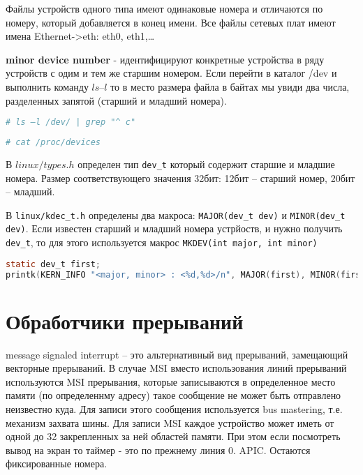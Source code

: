 Файлы устройств одного типа имеют одинаковые номера и отличаются по номеру, который добавляется в конец имени. Все файлы сетевых плат имеют имена Ethernet->eth: eth0, eth1,…

\textbf {minor device number} - идентифицируют конкретные устройства в ряду устройств с одим и тем же старшим номером. Если перейти в каталог /dev и выполнить команду $ls –l$ то в место размера файла в байтах мы увиди два числа, разделенных запятой (старший и младший номера).

\begin{lstlisting}[language=bash, caption = {выведет файлы символьных устрйоств}, label=code_file_sim_dev]
# ls –l /dev/ | grep "^ c" 
\end{lstlisting}

\begin{lstlisting}[language=bash, caption = {выведется информация о старших номерах устройств, известных ядру}, label=code_maj_num]
# cat /proc/devices 
\end{lstlisting}

В $linux/types.h$ определен тип \verb|dev_t| который содержит старшие и младшие номера. Размер соответствующего значения 32бит: 12бит – старший номер, 20бит – младший.

В \verb|linux/kdec_t.h| определены два макроса: \verb|MAJOR(dev_t dev)| и \verb|MINOR(dev_t dev)|.
Если известен старший и младший номера устрйоств, и нужно получить \verb|dev_t|, то для этого используется макрос
\verb|MKDEV(int major, int minor)|

\begin{lstlisting}[language=c, caption=Печать старшего и младшего номера устройства]
static dev_t first;
printk(KERN_INFO "<major, minor> : <%d,%d>/n", MAJOR(first), MINOR(first));
\end{lstlisting}

\section{Обработчики прерываний}
message signaled interrupt – это альтернативный вид прерываний, замещающий векторные прерываний.
В случае MSI вместо использования линий прерываний используются MSI прерывания, которые записываются в определенное место памяти (по определеннму адресу) такое сообщение не может быть отправлено неизвестно куда. Для записи этого сообщения используется bus mastering, т.е. механизм захвата шины. Для записи MSI каждое устройство может иметь от одной до 32 закрепленных за ней областей памяти. При этом если посмотреть вывод на экран то таймер - это по прежнему линия 0. APIC. Остаются фиксированные номера. 

